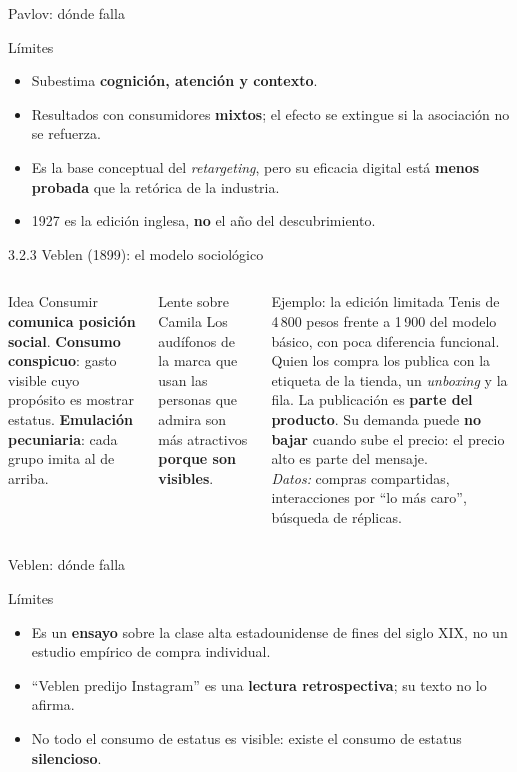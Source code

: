\documentclass[aspectratio=169,xcolor=dvipsnames]{beamer}
\begin{document}
\begin{frame}{Pavlov: dónde falla}
\begin{block}{Límites}
  \small
  \begin{itemize}
    \item Subestima \textbf{cognición, atención y contexto}.
    \item Resultados con consumidores \textbf{mixtos}; el efecto se extingue si la asociación no se refuerza.
    \item Es la base conceptual del \textit{retargeting}, pero su eficacia digital está \textbf{menos probada} que la retórica de la industria.
    \item 1927 es la edición inglesa, \textbf{no} el año del descubrimiento.
  \end{itemize}
\end{block}
\end{frame}

\begin{frame}{3.2.3 Veblen (1899): el modelo sociológico}
\begin{columns}[T]
  \begin{block}{Idea}
    \small Consumir \textbf{comunica posición social}. \textbf{Consumo conspicuo}: gasto visible cuyo propósito es mostrar estatus. \textbf{Emulación pecuniaria}: cada grupo imita al de arriba.
  \end{block}
  \begin{alertblock}{Lente sobre Camila}
    \small Los audífonos de la marca que usan las personas que admira son más atractivos \textbf{porque son visibles}.
  \end{alertblock}
  \begin{exampleblock}{Ejemplo: la edición limitada}
    \footnotesize Tenis de 4\,800 pesos frente a 1\,900 del modelo básico, con poca diferencia funcional. Quien los compra los publica con la etiqueta de la tienda, un \textit{unboxing} y la fila. La publicación es \textbf{parte del producto}. Su demanda puede \textbf{no bajar} cuando sube el precio: el precio alto es parte del mensaje.\\[2pt]
    \textit{Datos:} compras compartidas, interacciones por \enquote{lo más caro}, búsqueda de réplicas.
  \end{exampleblock}
\end{columns}
\end{frame}

\begin{frame}{Veblen: dónde falla}
\begin{block}{Límites}
  \small
  \begin{itemize}
    \item Es un \textbf{ensayo} sobre la clase alta estadounidense de fines del siglo XIX, no un estudio empírico de compra individual.
    \item \enquote{Veblen predijo Instagram} es una \textbf{lectura retrospectiva}; su texto no lo afirma.
    \item No todo el consumo de estatus es visible: existe el consumo de estatus \textbf{silencioso}.
  \end{itemize}
\end{block}
\end{frame}
\end{document}
